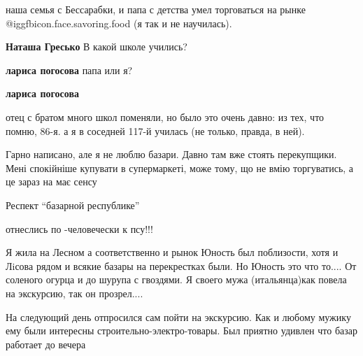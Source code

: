 \begin{itemize}
\begin{itemize}
наша семья с Бессарабки, и папа с детства умел торговаться на рынке
@igg{fbicon.face.savoring.food} (я так и не научилась).

\textbf{Наташа Гресько}
В какой школе учились?

\textbf{лариса погосова} папа или я?

\textbf{лариса погосова} 

отец с братом много школ поменяли, но было это очень давно: из тех, что помню,
86-я. а я в соседней 117-й училась (не только, правда, в ней).

\end{itemize} %


Гарно написано, але я не люблю базари. Давно там вже стоять перекупщики. Мені
спокійніше купувати в супермаркеті, може тому, що не вмію торгуватись, а це зараз
на має сенсу

Респект \enquote{базарной республике} 

отнеслись по -человечески к псу!!!

Я жила на Лесном а соответственно и рынок Юность был поблизости, хотя и Лiсова
рядом и всякие базары на перекрестках были. Но Юность это что то.... От соленого
огурца и до шурупа с гвоздями. Я своего мужа (итальянца)как повела на
экскурсию, так он прозрел....

На следующий день отпросился сам пойти на экскурсию. Как и любому мужику ему
были интересны строительно-электро-товары. Был приятно удивлен что базар
работает до вечера

\end{itemize} %

